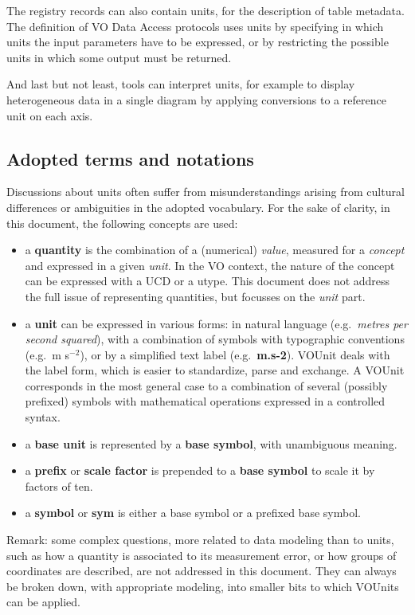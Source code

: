 \documentclass[11pt,notitlepage,onecolumn]{ivoa}
\def\eg{e.g.~}
\newcommand{\unit}[1]{\textbf{\textsf{\color{orange}#1}}}
\begin{document}
The registry records can also contain units, for the description of table metadata.
The definition of VO Data Access protocols uses units by specifying in which units the input
parameters have to be expressed, or by restricting the possible units in which some 
output must be returned.

And last but not least, tools can interpret units, for example to display
heterogeneous data in a single diagram by applying conversions to a reference 
unit on each axis.

\subsection{Adopted terms and notations\label{sec:notations}}

Discussions about units often suffer from misunderstandings arising from cultural
differences or ambiguities in the adopted vocabulary. For the sake of clarity, in this 
document, the following concepts are used:

\begin{itemize}
\item a {\bf quantity} is the combination of a (numerical) {\em value}, measured for a {\em concept} and expressed in a given {\em unit}. 
In the VO context, the nature of the concept can be expressed with a UCD or a utype. This document does not address the full issue of
representing quantities, but focusses on the {\em unit} part.
\item a {\bf unit} can be expressed in various forms: in natural language (\eg \emph{metres per second squared}), with a combination
of symbols with typographic conventions (\eg m s$^{-2}$), or by a simplified text label (\eg \unit{m.s-2}). VOUnit deals with the
label form, which is easier to standardize, parse and exchange. A VOUnit corresponds in the most general case to a combination of
several (possibly prefixed) symbols with mathematical operations expressed in a controlled syntax.
\item a {\bf base unit} is represented by a {\bf base symbol}, with unambiguous meaning.
\item a {\bf prefix} or {\bf scale factor} is prepended to a {\bf base symbol} to scale it by factors of ten.
\item a {\bf symbol} or \unit{sym} is either a base symbol or a prefixed base symbol.
\end{itemize}

Remark: some complex questions, more related to data modeling than to units, such as how a quantity 
is associated to its measurement error, or how groups of coordinates are described, are not addressed in this
document. They can always be broken down, with appropriate modeling, into smaller bits to which VOUnits can
be applied.
\end{document}
